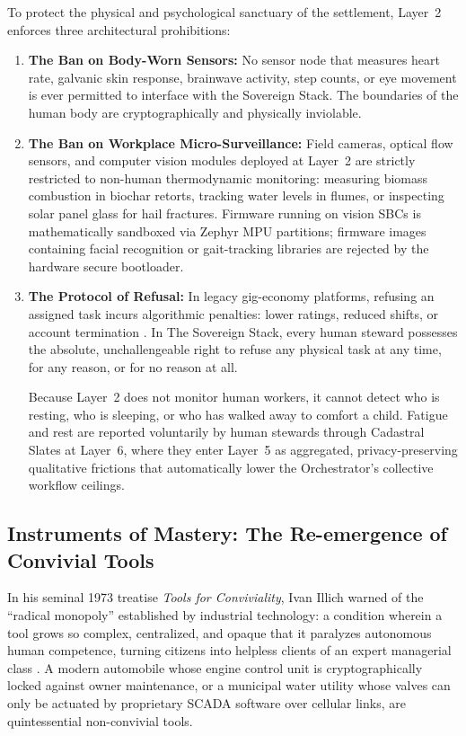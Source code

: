 To protect the physical and psychological sanctuary of the settlement, Layer~2 enforces three architectural prohibitions:
\begin{enumerate}
    \item \textbf{The Ban on Body-Worn Sensors:} No sensor node that measures heart rate, galvanic skin response, brainwave activity, step counts, or eye movement is ever permitted to interface with the Sovereign Stack. The boundaries of the human body are cryptographically and physically inviolable.
    \item \textbf{The Ban on Workplace Micro-Surveillance:} Field cameras, optical flow sensors, and computer vision modules deployed at Layer~2 are strictly restricted to non-human thermodynamic monitoring: measuring biomass combustion in biochar retorts, tracking water levels in flumes, or inspecting solar panel glass for hail fractures. Firmware running on vision SBCs is mathematically sandboxed via Zephyr MPU partitions; firmware images containing facial recognition or gait-tracking libraries are rejected by the hardware secure bootloader.
    \item \textbf{The Protocol of Refusal:} In legacy gig-economy platforms, refusing an assigned task incurs algorithmic penalties: lower ratings, reduced shifts, or account termination \parencite{kucklich2005}. In The Sovereign Stack, every human steward possesses the absolute, unchallengeable right to refuse any physical task at any time, for any reason, or for no reason at all. 

    Because Layer~2 does not monitor human workers, it cannot detect who is resting, who is sleeping, or who has walked away to comfort a child. Fatigue and rest are reported voluntarily by human stewards through Cadastral Slates at Layer~6, where they enter Layer~5 as aggregated, privacy-preserving qualitative frictions that automatically lower the Orchestrator's collective workflow ceilings.
\end{enumerate}

\subsection{Instruments of Mastery: The Re-emergence of Convivial Tools}

In his seminal 1973 treatise \textit{Tools for Conviviality}, Ivan Illich warned of the ``radical monopoly'' established by industrial technology: a condition wherein a tool grows so complex, centralized, and opaque that it paralyzes autonomous human competence, turning citizens into helpless clients of an expert managerial class \parencite{illich1973}. A modern automobile whose engine control unit is cryptographically locked against owner maintenance, or a municipal water utility whose valves can only be actuated by proprietary SCADA software over cellular links, are quintessential non-convivial tools.

